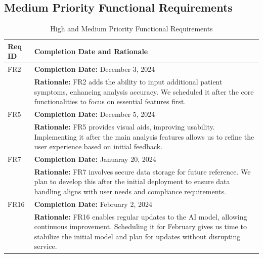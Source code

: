 \documentclass[12pt]{article}
\begin{document}
  \subsection{Medium Priority Functional Requirements}
\begin{table}[H]
  \label{TblMediumPriorityFRs}
  \begin{tabular}{p{}|p{}}
  \toprule
  \textbf{Req ID} & \textbf{Completion Date and Rationale} \\
  \midrule
  FR2 & \textbf{Completion Date:} December 3, 2024\\
      & \textbf{Rationale:} FR2 adds the ability to input additional patient symptoms, enhancing analysis accuracy. We scheduled it after the core functionalities to focus on essential features first. \\
  \midrule
  FR5 & \textbf{Completion Date:} December 5, 2024\\
      & \textbf{Rationale:} FR5 provides visual aids, improving usability. Implementing it after the main analysis features allows us to refine the user experience based on initial feedback. \\
  \midrule
  FR7 & \textbf{Completion Date:} Januaray 20, 2024\\
      & \textbf{Rationale:} FR7 involves secure data storage for future reference. We plan to develop this after the initial deployment to ensure data handling aligns with user needs and compliance requirements. \\
  \midrule
  FR16 & \textbf{Completion Date:} February 2, 2024\\
       & \textbf{Rationale:} FR16 enables regular updates to the AI model, allowing continuous improvement. Scheduling it for February gives us time to stabilize the initial model and plan for updates without disrupting service. \\
  \bottomrule
  \end{tabular}
  \caption{High and Medium Priority Functional Requirements}
  \end{table}
\end{document}
